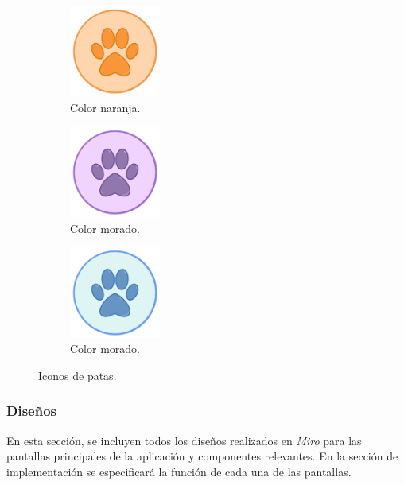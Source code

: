 \documentclass[a4paper, 12pt]{article}
\begin{document}
\begin{figure}[H]
   	\begin{subfigure}{0.48\textwidth}
		\begin{center}
			{\includegraphics[width=3cm]{logo/Pata1.png}\par}
			\caption{Color naranja.}
		\end{center}  
	\end{subfigure}\hfill
   	\begin{subfigure}{0.48\textwidth}
		\begin{center}
			{\includegraphics[width=3cm]{logo/Pata2.png}\par}
			\caption{Color morado.}
		\end{center}  
	\end{subfigure}\hfill
   	\begin{subfigure}{0.48\textwidth}
		\begin{center}
			{\includegraphics[width=3cm]{logo/Pata3.png}\par}
			\caption{Color morado.}
		\end{center}  
	\end{subfigure}\hfill
	\caption{Iconos de patas.}
\end{figure}


\newpage
\subsubsection{Diseños}

En esta sección, se incluyen todos los diseños realizados en \textit{Miro} para las pantallas principales de la aplicación y componentes relevantes. En la sección de implementación se especificará la función de cada una de las pantallas.
\end{document}
